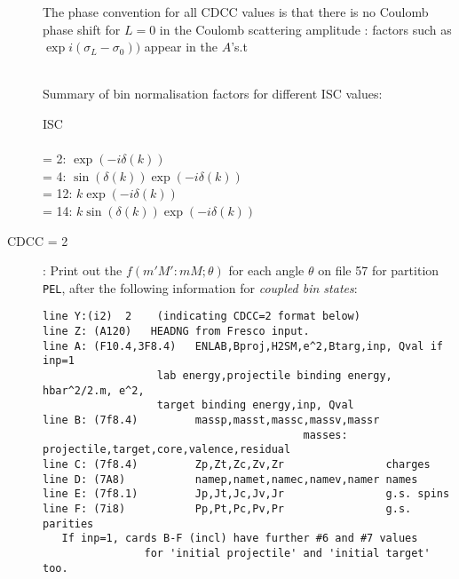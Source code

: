 \documentclass[11pt]{article}
\begin{document}
\begin{description}
The phase convention for all CDCC values is that there is no Coulomb phase shift
for $L = 0$ in the Coulomb scattering amplitude : factors such as
$\exp i(\sigma_L-\sigma_0))$  appear in the $A$'s.t

~\\
Summary of bin normalisation factors for different ISC values:

ISC\\
\\ = 2:  $\exp(-i\delta(k))$
\\ = 4:  $\sin(\delta(k))\exp(-i\delta(k))$
\\ = 12:  $k\exp(-i\delta(k))$
\\ = 14:  $k\sin(\delta(k))\exp(-i\delta(k))$

\item[CDCC = 2]:
Print out the $f(m'M':mM; \theta)$ for each angle $\theta$
on file 57 for partition {\tt PEL}, after the following information for {\em coupled bin states}:


{\footnotesize
\begin{verbatim}
line Y:(i2)  2    (indicating CDCC=2 format below)
line Z: (A120)   HEADNG from Fresco input.
line A: (F10.4,3F8.4)   ENLAB,Bproj,H2SM,e^2,Btarg,inp, Qval if inp=1
                  lab energy,projectile binding energy, hbar^2/2.m, e^2, 
                  target binding energy,inp, Qval 
line B: (7f8.4)         massp,masst,massc,massv,massr  
                                         masses: projectile,target,core,valence,residual
line C: (7f8.4)         Zp,Zt,Zc,Zv,Zr                charges
line D: (7A8)           namep,namet,namec,namev,namer names
line E: (7f8.1)         Jp,Jt,Jc,Jv,Jr                g.s. spins
line F: (7i8)           Pp,Pt,Pc,Pv,Pr                g.s. parities
   If inp=1, cards B-F (incl) have further #6 and #7 values 
                for 'initial projectile' and 'initial target' too.


\end{verbatim}}
\end{description}
\end{document}
